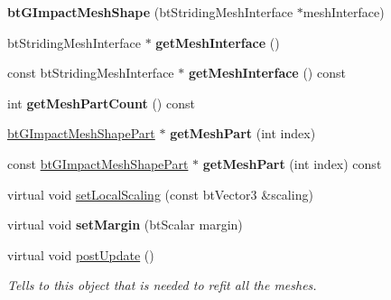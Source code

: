 \begin{DoxyCompactItemize}
\mbox{\label{classbtGImpactMeshShape_aa620d8c83b9f235068509f7caff0862f}} 
{\bfseries bt\+G\+Impact\+Mesh\+Shape} (bt\+Striding\+Mesh\+Interface $\ast$mesh\+Interface)
\item 
\mbox{\label{classbtGImpactMeshShape_ac4f392b95775eaf255efcd9b6a1383c2}} 
bt\+Striding\+Mesh\+Interface $\ast$ {\bfseries get\+Mesh\+Interface} ()
\item 
\mbox{\label{classbtGImpactMeshShape_a18b9a9ca4e207a1032673a4f2cd5accb}} 
const bt\+Striding\+Mesh\+Interface $\ast$ {\bfseries get\+Mesh\+Interface} () const
\item 
\mbox{\label{classbtGImpactMeshShape_a193bab01f3cbbf640d2ddf28763b10ba}} 
int {\bfseries get\+Mesh\+Part\+Count} () const
\item 
\mbox{\label{classbtGImpactMeshShape_abac8a0def4182767d8556d7ed8b08a7c}} 
\hyperlink{classbtGImpactMeshShapePart}{bt\+G\+Impact\+Mesh\+Shape\+Part} $\ast$ {\bfseries get\+Mesh\+Part} (int index)
\item 
\mbox{\label{classbtGImpactMeshShape_a106d86bb0104c72dd18060985a4e6d70}} 
const \hyperlink{classbtGImpactMeshShapePart}{bt\+G\+Impact\+Mesh\+Shape\+Part} $\ast$ {\bfseries get\+Mesh\+Part} (int index) const
\item 
virtual void \hyperlink{classbtGImpactMeshShape_aed8d5e4b2e75538109909d44b244bc35}{set\+Local\+Scaling} (const bt\+Vector3 \&scaling)
\item 
\mbox{\label{classbtGImpactMeshShape_aab65bdcfd34867e88a505a6377e4f79b}} 
virtual void {\bfseries set\+Margin} (bt\+Scalar margin)
\item 
\mbox{\label{classbtGImpactMeshShape_afbf7ae3408bc0ab975c46ed65820a4b2}} 
virtual void \hyperlink{classbtGImpactMeshShape_afbf7ae3408bc0ab975c46ed65820a4b2}{post\+Update} ()
\begin{DoxyCompactList}\small\item\em Tells to this object that is needed to refit all the meshes. \end{DoxyCompactList}\item 

\end{DoxyCompactItemize}

